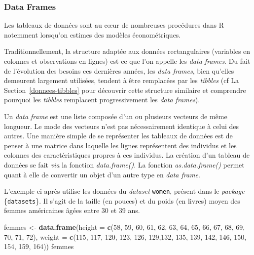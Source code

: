 \documentclass[
  11pt,
]{book}
\newenvironment{Shaded}{\begin{snugshade}}{\end{snugshade}}
\newcommand{\DataTypeTok}[1]{\textcolor[rgb]{0.13,0.29,0.53}{#1}}
\newcommand{\DecValTok}[1]{\textcolor[rgb]{0.00,0.00,0.81}{#1}}
\newcommand{\KeywordTok}[1]{\textcolor[rgb]{0.13,0.29,0.53}{\textbf{#1}}}
\newcommand{\NormalTok}[1]{#1}
\newcommand{\StringTok}[1]{\textcolor[rgb]{0.31,0.60,0.02}{#1}}
\numberwithin{equation}{section}
\numberwithin{countremarque}{section}
\begin{document}
\hypertarget{data-frames}{%
\subsubsection{Data Frames}\label{data-frames}}

Les tableaux de données sont au cœur de nombreuses procédures dans R notemment lorsqu'on estimes des modèles économétriques.

Traditionnellement, la structure adaptée aux données rectangulaires (variables en colonnes et observations en lignes) est ce que l'on appelle les \emph{data frames}. Du fait de l'évolution des besoins ces dernières années, les \emph{data frames}, bien qu'elles demeurent largement utilisées, tendent à être remplacées par les \emph{tibbles} (cf La Section~\ref{donnees-tibbles} pour découvrir cette structure similaire et comprendre pourquoi les \emph{tibbles} remplacent progressivement les \emph{data frames}).

Un \emph{data frame} est une liste composée d'un ou plusieurs vecteurs de même longueur. Le mode des vecteurs n'est pas nécessairement identique à celui des autres. Une manière simple de se représenter les tableaux de données est de penser à une matrice dans laquelle les lignes représentent des individus et les colonnes des caractéristiques propres à ces individus. La création d'un tableau de données se fait \emph{via} la fonction \emph{data.frame()}. La fonction \emph{as.data.frame()} permet quant à elle de convertir un objet d'un autre type en \emph{data frame}.

L'exemple ci-après utilise les données du \emph{dataset} \texttt{women}, présent dans le \emph{package} \{\texttt{datasets}\}. Il s'agit de la taille (en pouces) et du poids (en livres) moyen des femmes américaines âgées entre 30 et 39 ans.

\begin{Shaded}
\begin{Highlighting}[]
\NormalTok{femmes \textless{}{-}}\StringTok{ }
\StringTok{  }\KeywordTok{data.frame}\NormalTok{(}\DataTypeTok{height =} \KeywordTok{c}\NormalTok{(}\DecValTok{58}\NormalTok{, }\DecValTok{59}\NormalTok{, }\DecValTok{60}\NormalTok{, }\DecValTok{61}\NormalTok{, }\DecValTok{62}\NormalTok{, }\DecValTok{63}\NormalTok{, }\DecValTok{64}\NormalTok{,}
                        \DecValTok{65}\NormalTok{, }\DecValTok{66}\NormalTok{, }\DecValTok{67}\NormalTok{, }\DecValTok{68}\NormalTok{, }\DecValTok{69}\NormalTok{, }\DecValTok{70}\NormalTok{, }\DecValTok{71}\NormalTok{, }\DecValTok{72}\NormalTok{),}
           \DataTypeTok{weight =} \KeywordTok{c}\NormalTok{(}\DecValTok{115}\NormalTok{, }\DecValTok{117}\NormalTok{, }\DecValTok{120}\NormalTok{, }\DecValTok{123}\NormalTok{, }\DecValTok{126}\NormalTok{, }\DecValTok{129}\NormalTok{,}\DecValTok{132}\NormalTok{, }
                      \DecValTok{135}\NormalTok{, }\DecValTok{139}\NormalTok{, }\DecValTok{142}\NormalTok{, }\DecValTok{146}\NormalTok{, }\DecValTok{150}\NormalTok{, }\DecValTok{154}\NormalTok{, }\DecValTok{159}\NormalTok{, }\DecValTok{164}\NormalTok{))}
\NormalTok{femmes}
\end{Highlighting}
\end{Shaded}
\end{document}
